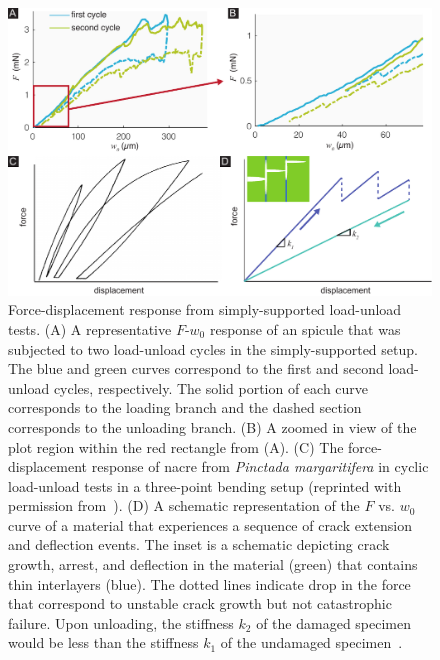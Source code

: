\begin{figure}[ht]
\centering
\includegraphics[width=\textwidth]{Figures/Figure6_V3.pdf}
\caption{Force-displacement response from simply-supported load-unload tests. (\textsf{A}) A representative $F$-$w_0$ response of an \EA spicule that was subjected to two load-unload cycles in the simply-supported setup. The blue and green
curves correspond to the first and second
load-unload cycles, respectively. The solid portion of each curve corresponds to the loading branch and the dashed section corresponds to the unloading branch. (\textsf{B}) A zoomed in view of the plot region within the red rectangle from (\textsf{A}). (\textsf{C}) The force-displacement response of nacre from \textit{Pinctada margaritifera} in cyclic load-unload tests in a three-point bending setup (reprinted with permission from~\cite{currey1977mechanical}). (\textsf{D}) A schematic representation of the $F$ vs. $w_0$ curve of a material that experiences a sequence of crack extension and deflection events. The inset is a schematic depicting crack growth, arrest, and deflection in the material (green) that contains thin interlayers (blue). The dotted lines indicate drop in the force that correspond to unstable crack growth but not catastrophic failure. Upon unloading, the stiffness $k_2$ of the damaged specimen would be less than the stiffness $k_1$ of the undamaged specimen~\cite{ouchterlony1981extension,bush1976experimentally}.}
\label{fig:TPBcyclic}
\end{figure}
